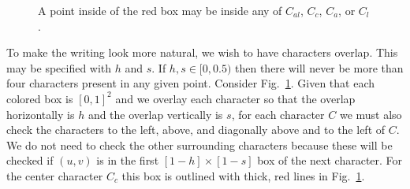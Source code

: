 \documentclass[12pt]{article}
\begin{document}
\begin{figure}[ht]
\centering
{}
\label{character-boxes}
\caption{A point inside of the red box may be inside any of $C_{al}$, $C_c$, $C_a$, or $C_l$.}
\end{figure}

To make the writing look more natural, we wish to have characters overlap. This may be specified with $h$ and $s$. If $h,s \in [0,0.5)$ then there will never be more than four characters present in any given point. Consider Fig.~\ref{character-boxes}. Given that each colored box is $[0,1]^2$ and we overlay each character so that the overlap horizontally is $h$ and the overlap vertically is $s$, for each character $C$ we must also check the characters to the left, above, and diagonally above and to the left of $C$. We do not need to check the other surrounding characters because these will be checked if $(u,v)$ is in the first $[1-h] \times [1-s]$ box of the next character. For the center character $C_c$ this box is outlined with thick, red lines in Fig.~\ref{character-boxes}.
\end{document}
